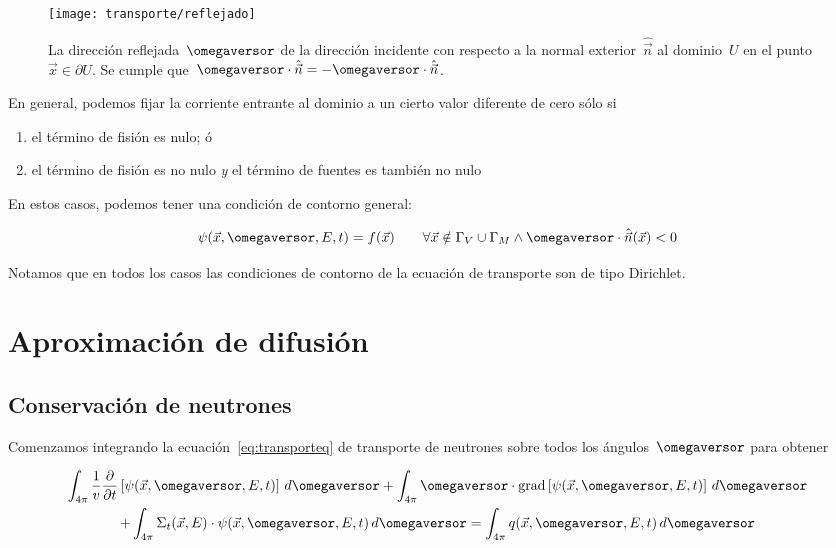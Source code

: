 \begin{figure}
\begin{center}
 \texttt{[image: transporte/reflejado]}
\end{center}
\caption{\label{fig:reflejado}La dirección reflejada~$\omegaversor$ de la dirección incidente con respecto a la normal exterior~$\hat{\vec{n}}$ al dominio~$U$ en el punto~$\vec{x} \in \partial U$. Se cumple que~$\omegaversor \cdot \hat{\vec{n}} = -\omegaversor \cdot \hat{\vec{n}}$.}
\end{figure}

\medskip

En general, podemos fijar la corriente entrante al dominio a un cierto valor diferente de cero sólo si

\begin{enumerate}
 \item el término de fisión es nulo; ó
 \item el término de fisión es no nulo \emph{y} el término de fuentes es también no nulo
\end{enumerate}

En estos casos, podemos tener una condición de contorno general:

\begin{equation*}
\psi(\vec{x}, \omegaversor, E, t) = f(\vec{x}) \quad\quad \forall \vec{x} \notin \Gamma_V \cup \Gamma_M \wedge \omegaversor \cdot \hat{\vec{n}}(\vec{x}) < 0
\end{equation*}

\medskip

Notamos que en todos los casos las condiciones de contorno de la ecuación de transporte son de tipo Dirichlet.

\section{Aproximación de difusión} %
\label{sec:difusion}

{\color{red} \lipsum[2]}

\subsection{Conservación de neutrones} %

{\color{red} \lipsum[2]}

Comenzamos integrando la ecuación~\eqref{eq:transporteq} de transporte de neutrones sobre todos los ángulos~$\omegaversor$ para obtener

\begin{multline*}
\int_{4\pi} \frac{1}{v} \frac{\partial}{\partial t} \left[ \psi(\vec{x}, \omegaversor, E, t) \right] \, d\omegaversor
 + \int_{4\pi} \omegaversor \cdot \text{grad} \left[ \psi(\vec{x}, \omegaversor, E, t) \right] \, d\omegaversor \\
 + \int_{4\pi} \Sigma_t(\vec{x}, E) \cdot \psi(\vec{x}, \omegaversor, E, t) \, d\omegaversor
 = \int_{4\pi} q(\vec{x}, \omegaversor, E, t)  \, d\omegaversor
\end{multline*}

